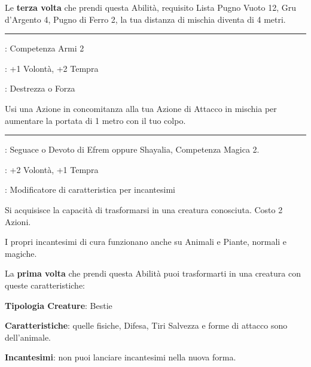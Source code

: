 \begin{multicols}{2}
Le \textbf{terza volta} che prendi questa Abilità, requisito Lista Pugno Vuoto 12, Gru d'Argento 4, Pugno di Ferro 2, la tua distanza di mischia diventa di 4 metri.

\smallskip\noindent\rule{\linewidth}{2pt} \hypertarget{Allungo}{}\medskip{}
\noindent
\begin{description}[noitemsep, topsep=0pt, parsep=0pt, partopsep=0pt, leftmargin=0cm, labelwidth=2.5cm]
    \item[\textbf{Requisito}]: Competenza Armi 2
    \item[\textbf{Tiri Salvezza}]: +1 Volontà, +2 Tempra
    \item[\textbf{Caratteristica}]: Destrezza o Forza
\end{description}

Usi una Azione in concomitanza alla tua Azione di Attacco in mischia per aumentare la portata di 1 metro con il tuo colpo.

\smallskip\noindent\rule{\linewidth}{2pt} \hypertarget{Animalia}{}\medskip{}
\noindent
\begin{description}[noitemsep, topsep=0pt, parsep=0pt, partopsep=0pt, leftmargin=0cm, labelwidth=2.5cm]
    \item[\textbf{Requisito}]: Seguace o Devoto di Efrem oppure Shayalia, Competenza Magica 2.
    \item[\textbf{Tiri Salvezza}]: +2 Volontà, +1 Tempra
    \item[\textbf{Caratteristica}]: Modificatore di caratteristica per incantesimi
\end{description}

Si acquisisce la capacità di trasformarsi in una creatura conosciuta. Costo 2 Azioni.

I propri incantesimi di cura funzionano anche su Animali e Piante, normali e magiche.

\medskip

La \textbf{prima volta} che prendi questa Abilità puoi trasformarti in una creatura con queste caratteristiche:

\medskip

\textbf{Tipologia Creature}: Bestie

\textbf{Caratteristiche}: quelle fisiche, Difesa, Tiri Salvezza e forme di attacco sono dell'animale.

\textbf{Incantesimi}: non puoi lanciare incantesimi nella nuova forma.


\end{multicols}
